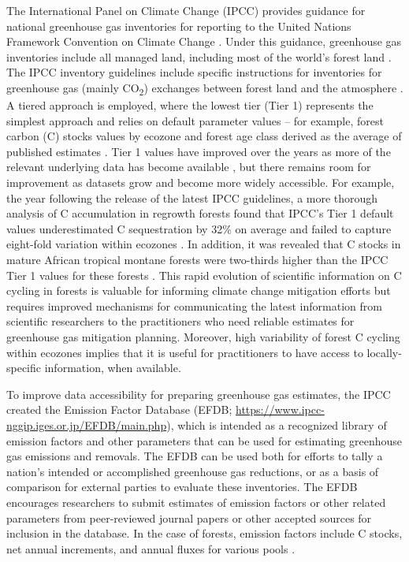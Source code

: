 \documentclass[, manuscript]{copernicus}
\begin{document}
The International Panel on Climate Change (IPCC) provides guidance for
national greenhouse gas inventories for reporting to the United Nations
Framework Convention on Climate Change
\citep[UNFCCC,][]{ipcc_2006_2006, ipcc_2019_2019}. Under this guidance,
greenhouse gas inventories include all managed land, including most of
the world's forest land \citep{ogle_delineating_2018}. The IPCC
inventory guidelines include specific instructions for inventories for
greenhouse gas (mainly CO\textsubscript{2}) exchanges between forest
land and the atmosphere \citep{ipcc_agriculture_2006, ipcc_2019_2019}. A
tiered approach is employed, where the lowest tier (Tier 1) represents
the simplest approach and relies on default parameter values -- for
example, forest carbon (C) stocks values by ecozone
\citep{fao_global_2012} and forest age class derived as the average of
published estimates \citep{ipcc_2019_2019, rozendaal_aboveground_2022}.
Tier 1 values have improved over the years as more of the relevant
underlying data has become available
\citep{requenasuarez_estimating_2019, rozendaal_aboveground_2022}, but
there remains room for improvement as datasets grow and become more
widely accessible. For example, the year following the release of the
latest IPCC guidelines, a more thorough analysis of C accumulation in
regrowth forests found that IPCC's Tier 1 default values underestimated
C sequestration by 32\% on average and failed to capture eight-fold
variation within ecozones \citep{cook-patton_mapping_2020}. In addition,
it was revealed that C stocks in mature African tropical montane forests
were two-thirds higher than the IPCC Tier 1 values for these forests
\citep{cuni-sanchez_high_2021}. This rapid evolution of scientific
information on C cycling in forests is valuable for informing climate
change mitigation efforts but requires improved mechanisms for
communicating the latest information from scientific researchers to the
practitioners who need reliable estimates for greenhouse gas mitigation
planning. Moreover, high variability of forest C cycling within ecozones
\citep[e.g.,][]{cook-patton_mapping_2020, cuni-sanchez_high_2021}
implies that it is useful for practitioners to have access to
locally-specific information, when available.

To improve data accessibility for preparing greenhouse gas estimates,
the IPCC created the Emission Factor Database (EFDB;
\url{https://www.ipcc-nggip.iges.or.jp/EFDB/main.php}), which is
intended as a recognized library of emission factors and other
parameters that can be used for estimating greenhouse gas emissions and
removals. The EFDB can be used both for efforts to tally a nation's
intended or accomplished greenhouse gas reductions, or as a basis of
comparison for external parties to evaluate these inventories. The EFDB
encourages researchers to submit estimates of emission factors or other
related parameters from peer-reviewed journal papers or other accepted
sources for inclusion in the database. In the case of forests, emission
factors include C stocks, net annual increments, and annual fluxes for
various pools \citep{ipcc_2006_2006, ipcc_2019_2019}.
\end{document}
